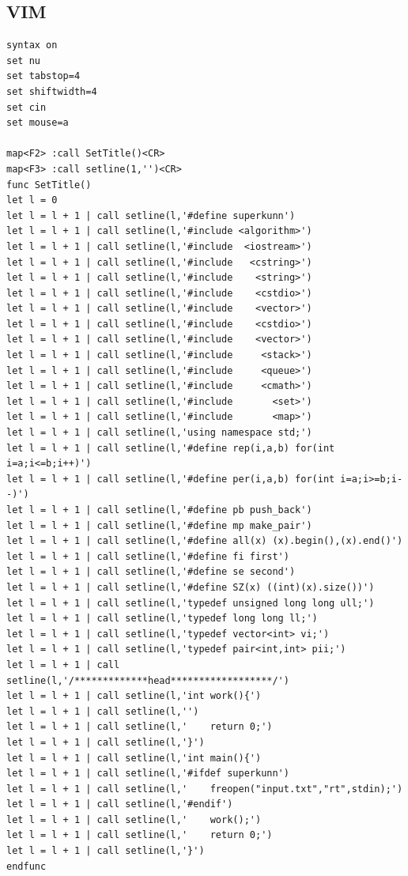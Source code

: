 \documentclass[twoside]{article}
\begin{document}
\subsection{VIM}
\begin{lstlisting}
syntax on
set nu
set tabstop=4
set shiftwidth=4
set cin
set mouse=a

map<F2> :call SetTitle()<CR>
map<F3> :call setline(1,'')<CR>
func SetTitle()
let l = 0
let l = l + 1 | call setline(l,'#define superkunn')
let l = l + 1 | call setline(l,'#include <algorithm>')
let l = l + 1 | call setline(l,'#include  <iostream>')
let l = l + 1 | call setline(l,'#include   <cstring>')
let l = l + 1 | call setline(l,'#include    <string>')
let l = l + 1 | call setline(l,'#include    <cstdio>')
let l = l + 1 | call setline(l,'#include    <vector>')
let l = l + 1 | call setline(l,'#include    <cstdio>')
let l = l + 1 | call setline(l,'#include    <vector>')
let l = l + 1 | call setline(l,'#include     <stack>')
let l = l + 1 | call setline(l,'#include     <queue>')
let l = l + 1 | call setline(l,'#include     <cmath>')
let l = l + 1 | call setline(l,'#include       <set>')
let l = l + 1 | call setline(l,'#include       <map>')
let l = l + 1 | call setline(l,'using namespace std;')
let l = l + 1 | call setline(l,'#define rep(i,a,b) for(int i=a;i<=b;i++)')
let l = l + 1 | call setline(l,'#define per(i,a,b) for(int i=a;i>=b;i--)')
let l = l + 1 | call setline(l,'#define pb push_back')
let l = l + 1 | call setline(l,'#define mp make_pair')
let l = l + 1 | call setline(l,'#define all(x) (x).begin(),(x).end()')
let l = l + 1 | call setline(l,'#define fi first')
let l = l + 1 | call setline(l,'#define se second')
let l = l + 1 | call setline(l,'#define SZ(x) ((int)(x).size())')
let l = l + 1 | call setline(l,'typedef unsigned long long ull;')
let l = l + 1 | call setline(l,'typedef long long ll;')
let l = l + 1 | call setline(l,'typedef vector<int> vi;')
let l = l + 1 | call setline(l,'typedef pair<int,int> pii;')
let l = l + 1 | call setline(l,'/*************head******************/')
let l = l + 1 | call setline(l,'int work(){')
let l = l + 1 | call setline(l,'')
let l = l + 1 | call setline(l,'    return 0;')
let l = l + 1 | call setline(l,'}')
let l = l + 1 | call setline(l,'int main(){')
let l = l + 1 | call setline(l,'#ifdef superkunn')
let l = l + 1 | call setline(l,'    freopen("input.txt","rt",stdin);')
let l = l + 1 | call setline(l,'#endif')
let l = l + 1 | call setline(l,'    work();')
let l = l + 1 | call setline(l,'    return 0;')
let l = l + 1 | call setline(l,'}')
endfunc
\end{lstlisting}
\end{document}
